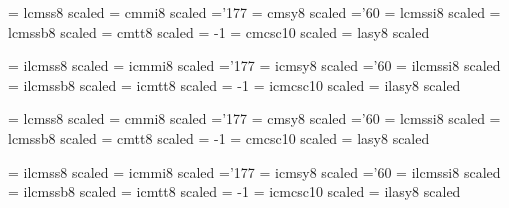  
\font\fourteenrm   = lcmss8  scaled  %
\font\fourteeni    = cmmi8   scaled  %
    \skewchar\fourteeni ='177                  %
\font\fourteensy   = cmsy8   scaled  %
    \skewchar\fourteensy ='60           %
\font\fourteenit   = lcmssi8 scaled  %
\font\fourteenbf   = lcmssb8 scaled  %
\font\fourteentt   = cmtt8   scaled  %
    \hyphenchar\fourteentt = -1         %
\font\fourteensc   = cmcsc10 scaled  %
\font\fourteenlasy = lasy8  scaled  %
 
\font\ifourteenrm   = ilcmss8  scaled  %
\font\ifourteeni    = icmmi8   scaled  %
    \skewchar\ifourteeni ='177                  %
\font\ifourteensy   = icmsy8   scaled  %
    \skewchar\ifourteensy ='60           %
\font\ifourteenit   = ilcmssi8 scaled  %
\font\ifourteenbf   = ilcmssb8 scaled  %
\font\ifourteentt   = icmtt8   scaled  %
    \hyphenchar\ifourteentt = -1         %
\font\ifourteensc   = icmcsc10 scaled  %
\font\ifourteenlasy = ilasy8  scaled  %
 
\font\seventeenrm   = lcmss8  scaled  %
\font\seventeeni    = cmmi8   scaled  %
    \skewchar\seventeeni ='177                  %
\font\seventeensy   = cmsy8   scaled  %
    \skewchar\seventeensy ='60           %
\font\seventeenit   = lcmssi8 scaled  %
\font\seventeenbf   = lcmssb8 scaled  %
\font\seventeentt   = cmtt8   scaled  %
    \hyphenchar\seventeentt = -1         %
\font\seventeensc   = cmcsc10 scaled  %
\font\seventeenlasy = lasy8  scaled  %
 
\font\iseventeenrm   = ilcmss8  scaled  %
\font\iseventeeni    = icmmi8   scaled  %
    \skewchar\iseventeeni ='177                  %
\font\iseventeensy   = icmsy8   scaled  %
    \skewchar\iseventeensy ='60           %
\font\iseventeenit   = ilcmssi8 scaled  %
\font\iseventeenbf   = ilcmssb8 scaled  %
\font\iseventeentt   = icmtt8   scaled  %
    \hyphenchar\iseventeentt = -1         %
\font\iseventeensc   = icmcsc10 scaled  %
\font\iseventeenlasy = ilasy8  scaled  %
 
